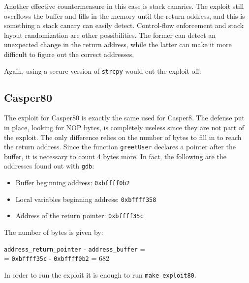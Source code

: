 Another effective countermeasure in this case is stack canaries. The exploit still overflows the buffer and fills in the memory until the return address, and this is something a stack canary can easily detect. Control-flow enforcement and stack layout randomization are other possibilities. The former can detect an unexpected change in the return address, while the latter can make it more difficult to figure out the correct addresses.

Again, using a secure version of \texttt{strcpy} would cut the exploit off.

\subsection{Casper80}
The exploit for Casper80 is exactly the same used for Casper8. The defense put in place, looking for NOP bytes, is completely useless since they are not part of the exploit. The only difference relies on the number of bytes to fill in to reach the return address. Since the function \texttt{greetUser} declares a pointer after the buffer, it is necessary to count 4 bytes more. In fact, the following are the addresses found out with \texttt{gdb}:
\begin{itemize}
	\item Buffer beginning address: \texttt{0xbffff0b2}
	\item Local variables beginning address: \texttt{0xbffff358}
	\item Address of the return pointer: \texttt{0xbffff35c}
\end{itemize}
The number of bytes is given by:
\begin{center}
	\texttt{address\_return\_pointer} - \texttt{address\_buffer} =\\
	= \texttt{0xbffff35c} - \texttt{0xbffff0b2} = 682
\end{center}


In order to run the exploit it is enough to run \texttt{make exploit80}.